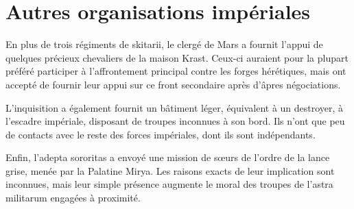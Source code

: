 \documentclass[10pt,a4paper]{book}
\begin{document}
\section{Autres organisations impériales}
En plus de trois régiments de skitarii, le clergé de Mars a fournit l'appui de quelques précieux chevaliers de la maison Krast. Ceux-ci auraient pour la plupart préféré participer à l'affrontement principal contre les forges hérétiques, mais ont accepté de fournir leur appui sur ce front secondaire après d'âpres négociations.

L'inquisition a également fournit un bâtiment léger, équivalent à un destroyer, à l'escadre impériale, disposant de troupes inconnues à son bord. Ils n'ont que peu de contacts avec le reste des forces impériales, dont ils sont indépendants.

Enfin, l'adepta sororitas a envoyé une mission de sœurs de l'ordre de la lance grise, menée par la Palatine Mirya. Les raisons exacts de leur implication sont inconnues, mais leur simple présence augmente le moral des troupes de l'astra militarum engagées à proximité.
\end{document}
